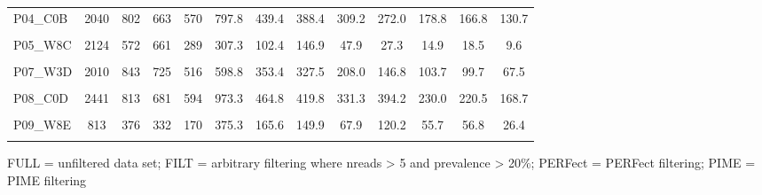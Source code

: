 \documentclass[
  10pt,
  letterpaper,
  DIV=11,
  numbers=noendperiod]{scrartcl}
\begin{document}
\begin{table}[H]
\begin{threeparttable}
\begin{tabular}[t]{lcccccccccccc}
P04\_C0B & 2040 & 802 & 663 & 570 & 797.8 & 439.4 & 388.4 & 309.2 & 272.0 & 178.8 & 166.8 & 130.7\\
\addlinespace
\cellcolor{gray!6}{P05\_W3C} & \cellcolor{gray!6}{1663} & \cellcolor{gray!6}{680} & \cellcolor{gray!6}{574} & \cellcolor{gray!6}{499} & \cellcolor{gray!6}{578.8} & \cellcolor{gray!6}{329.4} & \cellcolor{gray!6}{299.2} & \cellcolor{gray!6}{246.1} & \cellcolor{gray!6}{201.2} & \cellcolor{gray!6}{139.5} & \cellcolor{gray!6}{132.6} & \cellcolor{gray!6}{111.0}\\
P05\_W8C & 2124 & 572 & 661 & 289 & 307.3 & 102.4 & 146.9 & 47.9 & 27.3 & 14.9 & 18.5 & 9.6\\
\cellcolor{gray!6}{P06\_C0C} & \cellcolor{gray!6}{3065} & \cellcolor{gray!6}{1011} & \cellcolor{gray!6}{857} & \cellcolor{gray!6}{664} & \cellcolor{gray!6}{1098.4} & \cellcolor{gray!6}{518.7} & \cellcolor{gray!6}{481.3} & \cellcolor{gray!6}{324.7} & \cellcolor{gray!6}{309.4} & \cellcolor{gray!6}{182.0} & \cellcolor{gray!6}{179.7} & \cellcolor{gray!6}{120.6}\\
\addlinespace
P07\_W3D & 2010 & 843 & 725 & 516 & 598.8 & 353.4 & 327.5 & 208.0 & 146.8 & 103.7 & 99.7 & 67.5\\
\cellcolor{gray!6}{P07\_W8D} & \cellcolor{gray!6}{2157} & \cellcolor{gray!6}{771} & \cellcolor{gray!6}{671} & \cellcolor{gray!6}{276} & \cellcolor{gray!6}{560.8} & \cellcolor{gray!6}{284.2} & \cellcolor{gray!6}{270.3} & \cellcolor{gray!6}{88.1} & \cellcolor{gray!6}{91.5} & \cellcolor{gray!6}{60.2} & \cellcolor{gray!6}{60.2} & \cellcolor{gray!6}{24.4}\\
P08\_C0D & 2441 & 813 & 681 & 594 & 973.3 & 464.8 & 419.8 & 331.3 & 394.2 & 230.0 & 220.5 & 168.7\\
\addlinespace
\cellcolor{gray!6}{P09\_W3E} & \cellcolor{gray!6}{2386} & \cellcolor{gray!6}{874} & \cellcolor{gray!6}{751} & \cellcolor{gray!6}{563} & \cellcolor{gray!6}{680.1} & \cellcolor{gray!6}{352.7} & \cellcolor{gray!6}{334.5} & \cellcolor{gray!6}{224.4} & \cellcolor{gray!6}{168.5} & \cellcolor{gray!6}{110.3} & \cellcolor{gray!6}{109.4} & \cellcolor{gray!6}{76.5}\\
P09\_W8E & 813 & 376 & 332 & 170 & 375.3 & 165.6 & 149.9 & 67.9 & 120.2 & 55.7 & 56.8 & 26.4\\
\cellcolor{gray!6}{P10\_C0E} & \cellcolor{gray!6}{2066} & \cellcolor{gray!6}{670} & \cellcolor{gray!6}{571} & \cellcolor{gray!6}{491} & \cellcolor{gray!6}{886.8} & \cellcolor{gray!6}{416.5} & \cellcolor{gray!6}{379.4} & \cellcolor{gray!6}{298.3} & \cellcolor{gray!6}{427.6} & \cellcolor{gray!6}{242.8} & \cellcolor{gray!6}{231.4} & \cellcolor{gray!6}{174.7}\\
\bottomrule
\end{tabular}
\begin{tablenotes}
\item FULL = unfiltered data set; FILT = arbitrary filtering where nreads > 5 and prevalence > 20\%; PERFect = PERFect filtering; PIME = PIME filtering
\end{tablenotes}
\end{threeparttable}
\end{table}
\end{document}
